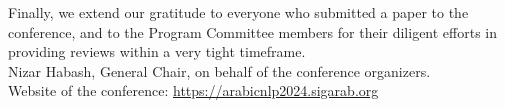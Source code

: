 Finally, we extend our gratitude to everyone who submitted a paper to the conference, and to the Program Committee members for their diligent efforts in providing reviews within a very tight timeframe.\\


Nizar Habash, General Chair, on behalf of the conference organizers.\\


Website of the conference: \url{https://arabicnlp2024.sigarab.org}

